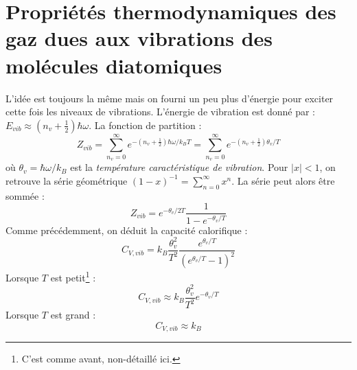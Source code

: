 \documentclass[british,french,11pt, a4paper, openany]{book}
\begin{document}
\section{Propriétés thermodynamiques des gaz dues aux vibrations des molécules 
	diatomiques}
L'idée est toujours la même mais on fourni un peu plus d'énergie pour exciter cette fois
les niveaux de vibrations. L'énergie de vibration est donné par : $E_{vib} \approx (n_v
+\frac{1}{2} )\hbar\omega$. La fonction de partition :
\begin{equation}
	Z_{vib} = \sum_{n_v=0}^\infty e^{-(n_v+\frac{1}{2})\hbar\omega/k_BT} = \sum_{n_v=0}^\infty
	e^{-(n_v+\frac{1}{2})\theta_v/T}
\end{equation}
où $\theta_v = \hbar\omega/k_B$ est la \textit{température caractéristique de vibration}.
Pour $|x|<1$, on retrouve la série géométrique $(1-x)^{-1} = \sum_{n=0}^\infty x^n$. La 
série peut alors être sommée : 
\begin{equation}
	Z_{vib} = e^{-\theta_v/2T}\frac{1}{1-e^{-\theta_v/T}}
\end{equation}
Comme précédemment, on déduit la capacité calorifique :
\begin{equation}
	C_{V,vib} = k_B \frac{\theta_v^2}{T^2}\frac{e^{\theta_v/T}}{(e^{\theta_v/T}-1)^2}
\end{equation}
Lorsque $T$ est petit\footnote{C'est comme avant, non-détaillé ici.} :
\begin{equation}
	C_{V,vib} \approx k_B \frac{\theta_v^2}{T^2}e^{-\theta_v/T}
\end{equation}
Lorsque $T$ est grand :
\begin{equation}
	C_{V,vib} \approx k_B
\end{equation}
\end{document}
